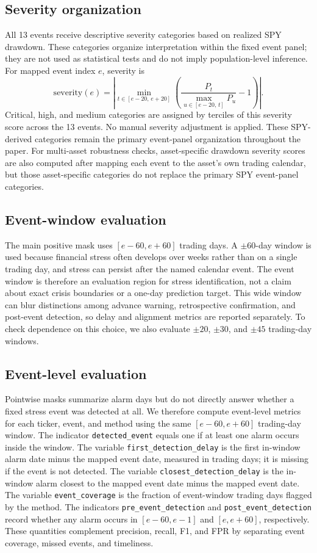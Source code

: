 \documentclass[10pt,twocolumn]{article}
\begin{document}
\subsection{Severity organization}
All 13 events receive descriptive severity categories based on realized SPY drawdown. These categories organize interpretation within the fixed event panel; they are not used as statistical tests and do not imply population-level inference. For mapped event index $e$, severity is
\begin{equation}
\mathrm{severity}(e)=\left|\min_{t\in[e-20,\,e+20]}\left(\frac{P_t}{\max_{u\in[e-20,\,t]}P_u}-1\right)\right|.
\end{equation}
Critical, high, and medium categories are assigned by terciles of this severity score across the 13 events. No manual severity adjustment is applied. These SPY-derived categories remain the primary event-panel organization throughout the paper. For multi-asset robustness checks, asset-specific drawdown severity scores are also computed after mapping each event to the asset's own trading calendar, but those asset-specific categories do not replace the primary SPY event-panel categories.

\subsection{Event-window evaluation}
The main positive mask uses $[e-60,e+60]$ trading days. A $\pm60$-day window is used because financial stress often develops over weeks rather than on a single trading day, and stress can persist after the named calendar event. The event window is therefore an evaluation region for stress identification, not a claim about exact crisis boundaries or a one-day prediction target. This wide window can blur distinctions among advance warning, retrospective confirmation, and post-event detection, so delay and alignment metrics are reported separately. To check dependence on this choice, we also evaluate $\pm20$, $\pm30$, and $\pm45$ trading-day windows.

\subsection{Event-level evaluation}
Pointwise masks summarize alarm days but do not directly answer whether a fixed stress event was detected at all. We therefore compute event-level metrics for each ticker, event, and method using the same $[e-60,e+60]$ trading-day window. The indicator \texttt{detected\_event} equals one if at least one alarm occurs inside the window. The variable \texttt{first\_detection\_delay} is the first in-window alarm date minus the mapped event date, measured in trading days; it is missing if the event is not detected. The variable \texttt{closest\_detection\_delay} is the in-window alarm closest to the mapped event date minus the mapped event date. The variable \texttt{event\_coverage} is the fraction of event-window trading days flagged by the method. The indicators \texttt{pre\_event\_detection} and \texttt{post\_event\_detection} record whether any alarm occurs in $[e-60,e-1]$ and $[e,e+60]$, respectively. These quantities complement precision, recall, F1, and FPR by separating event coverage, missed events, and timeliness.
\end{document}
